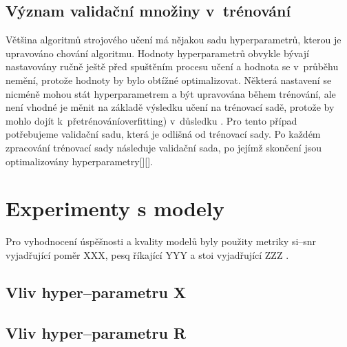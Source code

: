 \subsection{Význam validační množiny v~trénování}
Většina algoritmů strojového učení má nějakou sadu hyperparametrů, kterou je upravováno chování algoritmu. Hodnoty hyperparametrů obvykle bývají nastavovány ručně ještě před spuštěním procesu učení a hodnota se v~průběhu nemění, protože hodnoty by bylo obtížné optimalizovat. 
Některá nastavení se nicméně mohou stát hyperparametrem a být upravována během trénování, ale není vhodné je měnit na základě výsledku učení na trénovací sadě, protože by mohlo dojít k~přetrénováníoverfitting) v~důsledku . Pro tento případ potřebujeme validační sadu, která je odlišná od trénovací sady.
Po každém zpracování trénovací sady následuje validační sada, po jejímž skončení jsou optimalizovány hyperparametry[][].



\section{Experimenty s modely}

Pro vyhodnocení úspěšnosti a kvality modelů byly použity metriky si--snr vyjadřující poměr XXX, pesq říkající YYY a stoi vyjadřující ZZZ .  

\subsection{Vliv hyper--parametru X}

\subsection{Vliv hyper--parametru R}

